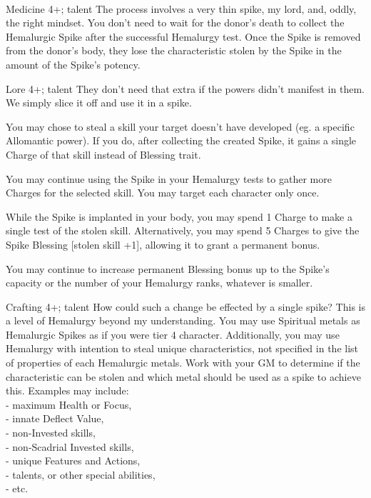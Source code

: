 \newpage ~~\\
\talent
	{\talentSpikeDdeathlessName{}}
	{Medicine 4+; \talentHemalurgyMedicineName{} talent}
	{\iconConstant}
	{The process involves a very thin spike, my lord, and, oddly, the right mindset.}
	{
		You don't need to wait for the donor's death to collect the Hemalurgic Spike after the successful Hemalurgy test. Once the Spike is removed from the donor's body, they lose the characteristic stolen by the Spike in the amount of the Spike's potency.
	}

\talent
	{\talentStealTraceName{}}
	{Lore 4+; \talentSpikeStackingName{} talent}
	{\iconConstant}
	{They don't need that extra if the powers didn't manifest in them. We simply slice it off and use it in a spike.}
	{
		You may chose to steal a skill your target doesn't have developed (eg. a specific Allomantic power). If you do, after collecting the created Spike, it gains a single Charge of that skill instead of Blessing trait.
		
		You may continue using the Spike in your Hemalurgy tests to gather more Charges for the selected skill. You may target each character only once.
		
		While the Spike is implanted in your body, you may spend 1 Charge to make a single test of the stolen skill. Alternatively, you may spend 5 Charges to give the Spike Blessing [stolen skill +1], allowing it to grant a permanent bonus.
		
		You may continue to increase permanent Blessing bonus up to the Spike's capacity or the number of your Hemalurgy ranks, whatever is smaller.
	}


\talent
	{\talentSinisterIntentName{}}
	{Crafting 4+; \talentSpikeRuinousName{} talent}
	{\iconConstant}
	{How could such a change be effected by a single spike? This is a level of Hemalurgy beyond my understanding.}
	{
		You may use Spiritual metals as Hemalurgic Spikes as if you were tier 4 character. Additionally, you may use Hemalurgy with intention to steal unique characteristics, not specified in the list of properties of each Hemalurgic metals. Work with your GM to determine if the characteristic can be stolen and which metal should be used as a spike to achieve this.		
		Examples may include: 
		\\ \hspace*{0.5cm} - maximum Health or Focus,  
		\\ \hspace*{0.5cm} - innate Deflect Value,  
		\\ \hspace*{0.5cm} - non-Invested skills,   
		\\ \hspace*{0.5cm} - non-Scadrial Invested skills,  
		\\ \hspace*{0.5cm} - unique Features and Actions,  
		\\ \hspace*{0.5cm} - talents, or other special abilities,  
		\\ \hspace*{0.5cm} - etc.
	}